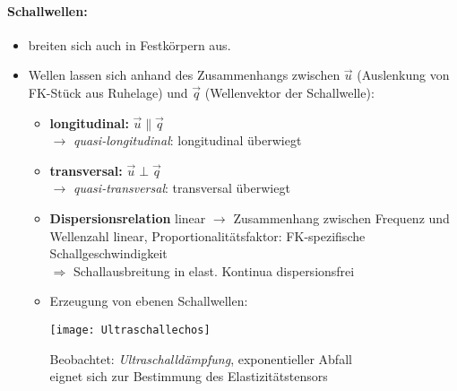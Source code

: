 \documentclass[a4paper,12pt]{article}
\begin{document}
\paragraph*{Schallwellen:} \begin{itemize}
	\item breiten sich auch in Festkörpern aus.
	\item Wellen lassen sich anhand des Zusammenhangs zwischen $ \vec u $ (Auslenkung von FK-Stück aus Ruhelage) und $ \vec q $ (Wellenvektor der Schallwelle):
	\begin{itemize}
		\item \textbf{longitudinal:} $ \vec u \parallel\vec q $\\
		$ \rightarrow $ \emph{quasi-longitudinal}: longitudinal überwiegt
		\item \textbf{transversal:} $ \vec u \perp \vec q $\\
		$ \rightarrow $ \emph{quasi-transversal}: transversal überwiegt
		\item \textbf{Dispersionsrelation} linear $ \rightarrow $ Zusammenhang zwischen Frequenz und Wellenzahl linear, Proportionalitätsfaktor: FK-spezifische Schallgeschwindigkeit\\
		$ \Rightarrow $ Schallausbreitung in elast. Kontinua dispersionsfrei
		\item Erzeugung von ebenen Schallwellen:
			\begin{center}
				\texttt{[image: Ultraschallechos]}
			\end{center}
			Beobachtet: \emph{Ultraschalldämpfung}, exponentieller Abfall\\
			eignet sich zur Bestimmung des Elastizitätstensors
	\end{itemize}
\end{itemize}
\end{document}
